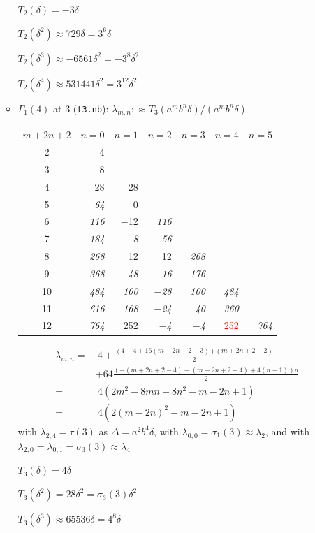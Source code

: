 \documentclass{rs}
\theoremstyle{definition}
\theoremstyle{remark}
\renewcommand{\D}{\Delta}
\renewcommand{\d}{\delta}
\newcommand{\G}{\Gamma}
\renewcommand{\l}{\lambda}
\newcommand{\si}{\sigma}
\newcommand{\T}{\tau}
\renewcommand{\=}{\approx}
\renewcommand{\-}{\sim}
\newcommand{\rd}[1]{\textcolor{red}{#1}}
\numberwithin{equation}{section}
\numberwithin{thm}{section}
\begin{document}
\begin{enumerate}[(i)]
\begin{itemize}
  $T_2(\d) = -3 \d$ 

  $T_2(\d^2) \= 729 \d = 3^6 \d$ 

  $T_2(\d^3) \= -6561 \d^2 = -3^8 \d^2$ 

  $T_2(\d^4) \= 531441 \d^2 = 3^{12} \d^2$ 

  \item $\G_1(4)$ at 3 (\texttt{t3.nb}): $\l_{m,n} :\= T_3(a^m b^n \d) / (a^m b^n \d)$ \\
  \begin{tabular}{c|rrrrrr}
   $m + 2 n + 2$ & $n = 0$ & $n = 1$ & $n = 2$ & $n = 3$ & $n = 4$ & $n = 5$ \\
   2 & 4 & & & & & \\
   3 & 8 & & & & & \\
   4 & 28 & 28 & & & & \\
   5 & {\em 64} & 0 & & & & \\
   6 & {\em 116} & $-$12 & {\em 116} & & & \\
   7 & {\em 184} & {\em $-$8} & {\em 56} & & & \\
   8 & {\em 268} & 12 & 12 & {\em 268} & & \\
   9 & {\em 368} & {\em 48} & {\em $-$16} & {\em 176} & & \\
   10 & {\em 484} & {\em 100} & {\em $-$28} & {\em 100} & {\em 484} & \\
   11 & {\em 616} & {\em 168} & {\em $-$24} & {\em 40} & {\em 360} & \\
   12 & {\em 764} & 252 & {\em $-$4} & {\em $-$4} & \rd{252} & {\em 764} 
  \end{tabular}
  \begin{equation*}
   \begin{split}
    \l_{m,n} = & ~ 4 + \frac{(4 + 4 + 16 (m + 2 n + 2 - 3)) (m + 2 n + 2 - 2)}{2} \\ 
               & + 64 \frac{(-(m + 2 n + 2 - 4) - (m + 2 n + 2 - 4) + 4 (n - 1)) n}{2} \\
             = & ~ 4 (2 m^2 - 8 m n + 8 n^2 - m - 2 n +1) \\
             = & ~ 4 (2 (m - 2 n)^2 - m - 2 n + 1) 
   \end{split}
  \end{equation*}
  with $\l_{2,4} = \T(3)$ as $\D = a^2 b^4 \d$, with $\l_{0,0} = \si_1(3) \= \l_2$, and with $\l_{2,0} = \l_{0,1} = \si_3(3) \= \l_4$ 

  $T_3(\d) = 4 \d$ 

  $T_3(\d^2) = 28 \d^2 = \si_3(3) \d^2$ 

  $T_3(\d^3) \= 65536 \d = 4^8 \d$ 


\end{itemize}
\end{enumerate}
\end{document}
